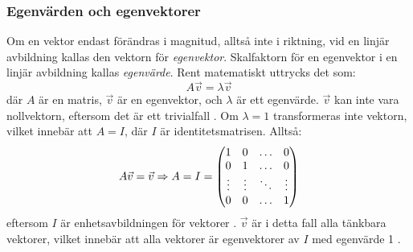 \subsubsection{Egenvärden och egenvektorer}
Om en vektor endast förändras i magnitud, alltså inte i riktning, vid en linjär avbildning kallas den vektorn för \emph{egenvektor}. Skalfaktorn för en egenvektor i en linjär avbildning kallas \emph{egenvärde}. Rent matematiskt uttrycks det som:
\begin{equation}\label{eq:eigenvalue-eigenvector-def}
    A\vec{v}=\lambda\vec{v}
\end{equation} där \(A\) är en matris, \(\vec{v}\) är en egenvektor, och \(\lambda\) är ett egenvärde. \(\vec{v}\) kan inte vara nollvektorn, eftersom det är ett trivialfall \parencites[App-14]{zill_differential_2005}[283]{strang_introduction_2009}. Om \(\lambda=1\) transformeras inte vektorn, vilket innebär att \(A=I\), där \(I\) är identitetsmatrisen. Alltså:
\begin{equation}
    A\vec{v}=\vec{v}\Rightarrow A=I=
    \begin{pmatrix}
        1 & 0 & \hdots & 0\\
        0 & 1 & \hdots & 0\\
        \vdots & \vdots & \ddots & \vdots\\
        0 & 0 & \hdots & 1
    \end{pmatrix}
\end{equation} eftersom \(I\) är enhetsavbildningen för vektorer \parencite{noauthor_identitetselement_nodate}. \(\vec{v}\) är i detta fall alla tänkbara vektorer, vilket innebär att alla vektorer är egenvektorer av \(I\) med egenvärde 1 \parencite[283]{strang_introduction_2009}.

